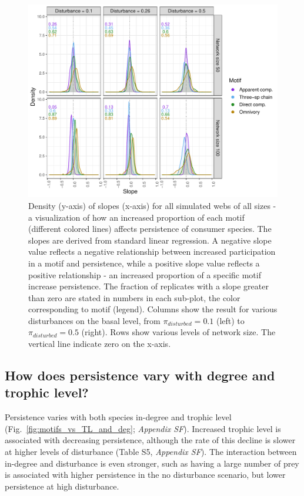 \documentclass[12pt]{article}
\begin{document}
\begin{spacing}{2.0}
        \begin{figure}[h!]
             \centering
             \includegraphics[width=\textwidth]{figures/prop_dens_bp_vs_S_allC.pdf}
            \caption{Density (y-axis) of slopes (x-axis) for all simulated webs of all sizes - a visualization of how an increased proportion of each motif (different colored lines) affects persistence of consumer species. The slopes are derived from standard linear regression. A negative slope value reflects a negative relationship between increased participation in a motif and persistence, while a positive slope value reflects a positive relationship - an increased proportion of a specific motif increase persistence. The fraction of replicates with a slope greater than zero are stated in numbers in each sub-plot, the color corresponding to motif (legend). Columns show the result for various disturbances on the basal level, from $\pi_{disturbed} = 0.1$ (left) to $\pi_{disturbed} = 0.5$ (right). Rows show various levels of network size. The vertical line indicate zero on the x-axis.}
            \label{fig:density_prop_S}
        \end{figure}    
    
    \clearpage
    
    \subsection*{How does persistence vary with degree and trophic level?}
    
        Persistence varies with both species in-degree and trophic level (Fig.~\ref{fig:motifs_vs_TL_and_deg}; \emph{Appendix SF}). Increased trophic level is associated with decreasing persistence, although the rate of this decline is slower at higher levels of disturbance (Table S5, \emph{Appendix SF}).
        The interaction between in-degree and disturbance is even stronger, such as having a large number of prey is associated with higher persistence in the no disturbance scenario, but lower persistence at high disturbance.
        


\end{spacing}
\end{document}
